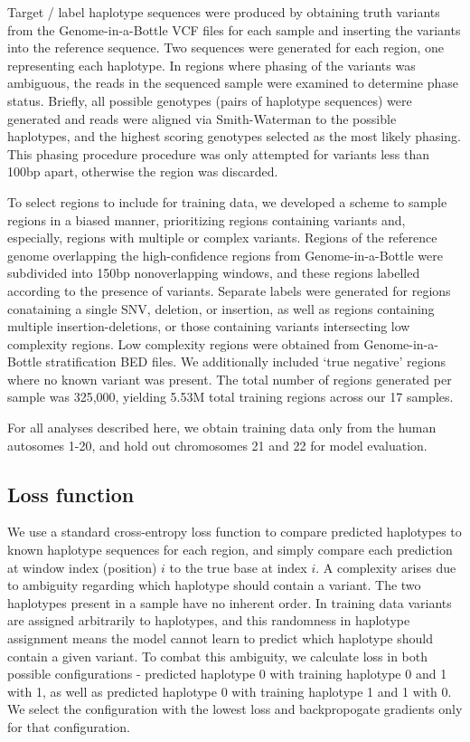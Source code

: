 \documentclass[]{article}
\begin{document}
Target / label haplotype sequences were produced by obtaining truth variants from the Genome-in-a-Bottle VCF files for each sample and inserting the variants into the reference sequence. Two sequences were generated for each region, one representing each haplotype. In regions where phasing of the variants was ambiguous, the reads in the sequenced sample were examined to determine phase status. Briefly, all possible genotypes (pairs of haplotype sequences) were generated and reads were aligned via Smith-Waterman to the possible haplotypes, and the highest scoring genotypes selected as the most likely phasing. This phasing procedure procedure was only attempted for variants less than 100bp apart, otherwise the region was discarded.

To select regions to include for training data, we developed a scheme to sample regions in a biased manner, prioritizing regions containing variants and, especially, regions with multiple or complex variants. Regions of the reference genome overlapping the high-confidence regions from Genome-in-a-Bottle were subdivided into 150bp nonoverlapping windows, and these regions labelled according to the presence of variants. Separate labels were generated for regions conataining a single SNV, deletion, or insertion, as well as regions containing multiple insertion-deletions, or those containing variants intersecting  low complexity regions. Low complexity regions were obtained from Genome-in-a-Bottle stratification BED files. We additionally included `true negative' regions where no known variant was present. The total number of regions generated per sample was 325,000, yielding 5.53M total training regions across our 17 samples.

For all analyses described here, we obtain training data only from the human autosomes 1-20, and hold out chromosomes 21 and 22 for model evaluation. 

\subsection{Loss function}

We use a standard cross-entropy loss function to compare predicted haplotypes to known haplotype sequences for each region, and simply compare each prediction at window index (position) $i$ to the true base at index $i$. A complexity arises due to ambiguity regarding which haplotype should contain a variant. The two haplotypes present in a sample have no inherent order. In training data variants are assigned arbitrarily to haplotypes, and this randomness in haplotype assignment means the model cannot learn to predict which haplotype should contain a given variant. To combat this ambiguity, we calculate loss in both possible configurations - predicted haplotype 0 with training haplotype 0 and 1 with 1, as well as predicted haplotype 0 with training haplotype 1 and 1 with 0. We select the configuration with the lowest loss and backpropogate gradients only for that configuration. 
\end{document}
